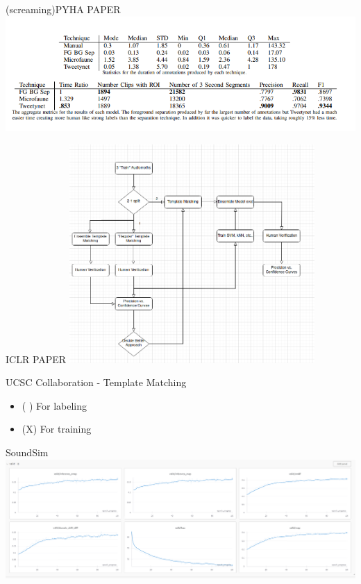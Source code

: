 
\begin{frame}{(screaming)PYHA PAPER}
    \centering
    \includegraphics[height=1\textheight,width=1\textwidth,keepaspectratio]{model_performance_01_23.png}
\end{frame}

\begin{frame}{ICLR PAPER}
    \centering
    \includegraphics[height=0.7\textheight,width=0.7\textwidth,keepaspectratio]{ICLR_WORKFLOW.png}
\end{frame}

\begin{frame}{UCSC Collaboration - Template Matching}
    \begin{itemize}
        \item ( ) For labeling
        \item (X) For training
    \end{itemize}
\end{frame}

\begin{frame}{SoundSim}
    \centering
    \includegraphics[height=1\textheight,width=1\textwidth,keepaspectratio]{sound_sim_baseline.png}
\end{frame}

